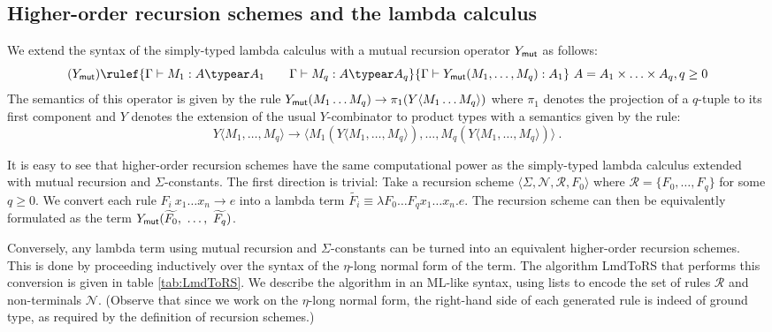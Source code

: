 \subsection{Higher-order recursion schemes and the lambda calculus}
\newcommand\ymut{Y_{\sf mut}}
We extend the syntax of the simply-typed lambda calculus with a mutual recursion operator $\ymut$ as follows:
 $$ (\ymut) \rulef{\Gamma \vdash M_1 : A \typear A_1 \qquad \Gamma \vdash M_q : A \typear A_q}{\Gamma \vdash \ymut (M_1, \ldots, M_q):A_1}\ A = A_1 \times \ldots \times A_q, q \geq 0$$
The semantics of this operator is given by the rule
$ \ymut (M_1 \ldots M_q) \rightarrow \pi_1 (Y \langle M_1 \ldots M_q \rangle)$
where $\pi_1$ denotes the projection of a $q$-tuple to its first component and $Y$ denotes the extension of the usual $Y$-combinator to product types with a semantics given by the rule:
$$ Y \langle M_1, \ldots, M_q \rangle \rightarrow
\langle M_1 (Y \langle M_1, \ldots, M_q \rangle),
\ldots, M_q (Y \langle M_1, \ldots, M_q \rangle) \rangle \ .$$


It is easy to see that higher-order recursion schemes have the same computational power as the simply-typed lambda calculus extended with mutual recursion and $\Sigma$-constants.
The first direction is trivial: Take a recursion scheme $\langle \Sigma, \mathcal{N}, \mathcal{R}, F_0 \rangle$
where $\mathcal{R} = \{ F_0, \ldots, F_q \}$ for some $q\geq 0$.
We convert each rule $F_i\ x_1 \ldots x_n \rightarrow e$ into a lambda term $\widetilde{F_i} \equiv \lambda F_0 \ldots F_q x_1 \ldots x_n . e$. The recursion scheme can then be equivalently formulated as the term $\ymut ( \widetilde{F_0},\ \ldots,\  \widetilde{F_q})$.

Conversely, any lambda term using mutual recursion and $\Sigma$-constants can be turned into an equivalent higher-order recursion schemes. This is done by proceeding inductively over the syntax of the $\eta$-long normal form of the term.
The algorithm {\sf LmdToRS} that performs this conversion is given in table \ref{tab:LmdToRS}. We describe the algorithm in an ML-like syntax, using lists to encode the set of rules $\mathcal{R}$ and non-terminals $\mathcal{N}$. (Observe that since we work on the $\eta$-long normal form, the right-hand side of each generated rule is indeed of ground type, as required by the definition of recursion schemes.)



